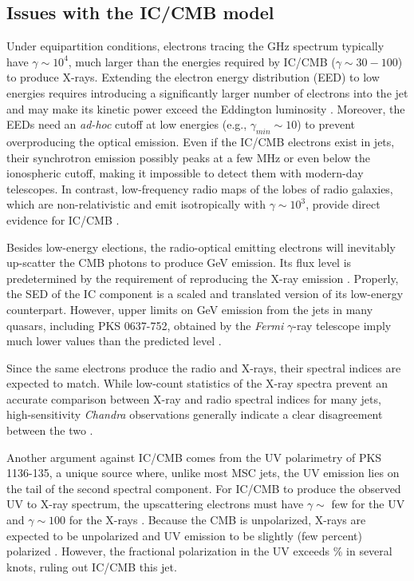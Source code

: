\subsection{Issues with the IC/CMB model}
Under equipartition conditions, electrons tracing the GHz spectrum typically have $\gamma\sim10^4$, much larger than the energies required by IC/CMB ($\gamma\sim 30-100$) to produce X-rays. Extending the electron energy distribution (EED) to low energies requires introducing a significantly larger number of electrons into the jet and may make its kinetic power exceed the Eddington luminosity  \citep{dermer2004nonthermal}. Moreover, the EEDs need an \textit{ad-hoc} cutoff at low energies (e.g., $\gamma_{min}\sim 10$) to prevent overproducing the optical emission. Even if the IC/CMB electrons exist in jets, their synchrotron emission possibly peaks at a few MHz or even below the ionospheric cutoff, making it impossible to detect them with modern-day telescopes. In contrast, low-frequency radio maps of the lobes of radio galaxies, which are non-relativistic and emit isotropically with $\gamma\sim10^3$, provide direct evidence for IC/CMB  \citep[e.g., ][]{1995ApJ...449L.149F}.

Besides low-energy elections, the radio-optical emitting electrons will inevitably up-scatter the CMB photons to produce  GeV emission. Its flux level is predetermined by the requirement of reproducing the X-ray emission \citep{georganopoulos2006quasar}. Properly, the SED of the IC component is a scaled and translated version of its low-energy counterpart. However, upper limits on GeV emission from the jets in many quasars, including PKS 0637-752, obtained by the \textit{Fermi} $\gamma$-ray telescope imply much lower values than the predicted level \citep{meyer2015ruling,breiding2017fermi}. 

Since the same electrons produce the radio and X-rays, their spectral indices are expected to match. While low-count statistics of the X-ray spectra prevent an accurate comparison between X-ray and radio spectral indices for many jets, high-sensitivity \textit{Chandra} observations generally indicate a clear disagreement between the two \citep[e.g.,][]{jester2006new,2007ApJ...657..145S}.

Another argument against IC/CMB comes from the UV polarimetry of
PKS 1136-135, a unique source where, unlike most MSC jets, the UV emission lies on the tail of the second spectral component. For IC/CMB to produce the observed UV to X-ray spectrum, the upscattering electrons must have $\gamma\sim$ few for the UV and $\gamma\sim100$ for the X-rays \citep{uchiyama2007infrared}. Because the CMB is unpolarized, X-rays are expected to be unpolarized and UV emission to be slightly (few percent) polarized  \citep{uchiyama_2008,mcnamara2009x}. However, the fractional polarization in the UV exceeds \% in several knots, ruling out IC/CMB this jet\citep{cara2013polarimetry}.

